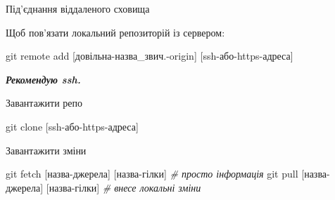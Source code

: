 \documentclass[
  ignorenonframetext,
  aspectratio=169,
]{beamer}
\newenvironment{Shaded}{}{}
\newcommand{\CommentTok}[1]{\textcolor[rgb]{0.38,0.63,0.69}{\textit{#1}}}
\newcommand{\FunctionTok}[1]{\textcolor[rgb]{0.02,0.16,0.49}{#1}}
\newcommand{\NormalTok}[1]{#1}
\newcommand{\PreprocessorTok}[1]{\textcolor[rgb]{0.74,0.48,0.00}{#1}}
\newcommand{\SpecialStringTok}[1]{\textcolor[rgb]{0.73,0.40,0.53}{#1}}
\begin{document}
\begin{frame}[fragile]{Під'єднання віддаленого сховища}
\protect\hypertarget{ux43fux456ux434ux454ux434ux43dux430ux43dux43dux44f-ux432ux456ux434ux434ux430ux43bux435ux43dux43eux433ux43e-ux441ux445ux43eux432ux438ux449ux430}{}
\begin{block}{Щоб пов'язати локальний репозиторій із сервером:}
\protect\hypertarget{ux449ux43eux431-ux43fux43eux432ux44fux437ux430ux442ux438-ux43bux43eux43aux430ux43bux44cux43dux438ux439-ux440ux435ux43fux43eux437ux438ux442ux43eux440ux456ux439-ux456ux437-ux441ux435ux440ux432ux435ux440ux43eux43c}{}
\begin{Shaded}
\begin{Highlighting}[]
\FunctionTok{git}\NormalTok{ remote add }\PreprocessorTok{[}\SpecialStringTok{довільна}\PreprocessorTok{{-}}\SpecialStringTok{назва\_звич.}\PreprocessorTok{{-}}\SpecialStringTok{origin}\PreprocessorTok{]} \PreprocessorTok{[}\SpecialStringTok{ssh}\PreprocessorTok{{-}}\SpecialStringTok{або}\PreprocessorTok{{-}}\SpecialStringTok{https}\PreprocessorTok{{-}}\SpecialStringTok{адреса}\PreprocessorTok{]}
\end{Highlighting}
\end{Shaded}

\textbf{\emph{Рекомендую ssh.}}

\pause
\end{block}

\begin{block}{Завантажити репо}
\protect\hypertarget{ux437ux430ux432ux430ux43dux442ux430ux436ux438ux442ux438-ux440ux435ux43fux43e}{}
\begin{Shaded}
\begin{Highlighting}[]
\FunctionTok{git}\NormalTok{ clone }\PreprocessorTok{[}\SpecialStringTok{ssh}\PreprocessorTok{{-}}\SpecialStringTok{або}\PreprocessorTok{{-}}\SpecialStringTok{https}\PreprocessorTok{{-}}\SpecialStringTok{адреса}\PreprocessorTok{]}
\end{Highlighting}
\end{Shaded}

\pause
\end{block}

\begin{block}{Завантажити зміни}
\protect\hypertarget{ux437ux430ux432ux430ux43dux442ux430ux436ux438ux442ux438-ux437ux43cux456ux43dux438}{}
\begin{Shaded}
\begin{Highlighting}[]
\FunctionTok{git}\NormalTok{ fetch }\PreprocessorTok{[}\SpecialStringTok{назва}\PreprocessorTok{{-}}\SpecialStringTok{джерела}\PreprocessorTok{]} \PreprocessorTok{[}\SpecialStringTok{назва}\PreprocessorTok{{-}}\SpecialStringTok{гілки}\PreprocessorTok{]} \CommentTok{\# просто інформація}
\FunctionTok{git}\NormalTok{ pull }\PreprocessorTok{[}\SpecialStringTok{назва}\PreprocessorTok{{-}}\SpecialStringTok{джерела}\PreprocessorTok{]} \PreprocessorTok{[}\SpecialStringTok{назва}\PreprocessorTok{{-}}\SpecialStringTok{гілки}\PreprocessorTok{]}  \CommentTok{\# внесе локальні зміни}
\end{Highlighting}
\end{Shaded}
\end{block}
\end{frame}
\end{document}
